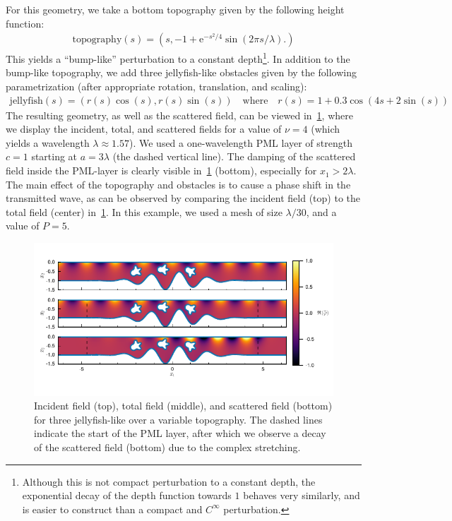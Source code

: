 \documentclass[review,hidelinks,onefignum,onetabnum]{siamart220329}
\newcommand{\e}{\mathrm{e}}
\begin{document}
For this geometry, we take a bottom topography given by the following height function:
\begin{align}
    \mathrm{topography}(s) = (s,-1 + \e^{-s^2/4} \sin(2\pi s /\lambda).)
\end{align}
This yields a ``bump-like'' perturbation to a constant depth\footnote{Although this is not compact perturbation to a constant depth, the exponential decay of the depth function towards $1$ behaves very similarly, and is easier to construct than a compact and $C^\infty$ perturbation.}. In addition to the bump-like topography, we add three jellyfish-like obstacles given by the following parametrization (after appropriate rotation, translation, and scaling):
\begin{align}
    \mathrm{jellyfish}(s) = (r(s)\cos(s),r(s)\sin(s)) \quad \mbox{where} \quad r(s) = 1+0.3\cos(4s+2\sin(s))
\end{align}
The resulting geometry, as well as the scattered field, can be viewed in~\cref{fig:jellyfish-fields}, where we display the incident, total, and scattered fields for a value of $\nu=4$ (which yields a wavelength $\lambda \approx 1.57$). We used a one-wavelength PML layer of strength $c=1$ starting at $a=3\lambda$ (the dashed vertical line). The damping of the scattered field inside the PML-layer is clearly visible in~\cref{fig:jellyfish-fields} (bottom), especially for $x_1 > 2\lambda$. The main effect of the topography and obstacles is to cause a phase shift in the transmitted wave, as can be observed by comparing the incident field (top) to the total field (center) in~\cref{fig:jellyfish-fields}. In this example, we used a mesh of size $\lambda/30$, and a value of $P=5$. 

\begin{figure}[ht!]
  \centering
  \vspace{-30pt}
  \includegraphics[width=1\textwidth]{jellyfish_fields.pdf}
  \vspace{-30pt}
  \caption{Incident field (top), total field (middle), and scattered field (bottom) for three jellyfish-like over a variable topography. The dashed lines indicate the start of the PML layer, after which we observe a decay of the scattered field (bottom) due to the complex stretching.}
  \label{fig:jellyfish-fields}
\end{figure}
\end{document}
